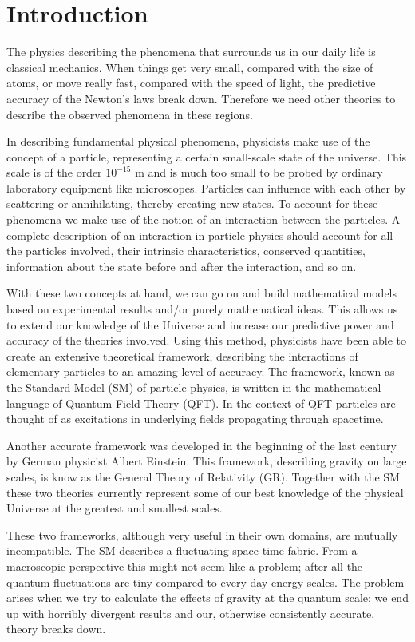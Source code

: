 \section{Introduction}
The physics describing the phenomena that surrounds us in our daily life is classical mechanics. When things get very small, compared with the size of atoms, or move really fast, compared with the speed of light, the predictive accuracy of the Newton's laws break down. Therefore we need other theories to describe the observed phenomena in these regions.

In describing fundamental physical phenomena, physicists make use of the concept of a particle, representing a certain small-scale state of the universe. This scale is of the order $10^{-15}$ m and is much too small to be probed by ordinary laboratory equipment like microscopes. Particles can influence with each other by scattering or annihilating, thereby creating new states. To account for these phenomena we make use of the notion of an interaction between the particles. A complete description of an interaction in particle physics should account for all the particles involved, their intrinsic characteristics, conserved quantities, information about the state before and after the interaction, and so on.

With these two concepts at hand, we can go on and build mathematical models based on experimental results and/or purely mathematical ideas. This allows us to extend our knowledge of the Universe and increase our predictive power and accuracy of the theories involved. Using this method, physicists have been able to create an extensive theoretical framework, describing the interactions of elementary particles to an amazing level of accuracy. The framework, known as the Standard Model (SM) of particle physics, is written in the mathematical language of Quantum Field Theory (QFT). In the context of QFT particles are thought of as excitations in underlying fields propagating through spacetime.

Another accurate framework was developed in the beginning of the last century by German physicist Albert Einstein. This framework, describing gravity on large scales, is know as the General Theory of Relativity (GR). Together with the SM these two theories currently represent some of our best knowledge of the physical Universe at the greatest and smallest scales.

These two frameworks, although very useful in their own domains, are mutually incompatible. The SM describes a fluctuating space time fabric. From a macroscopic perspective this might not seem like a problem; after all the quantum fluctuations are tiny compared to every-day energy scales. The problem arises when we try to calculate the effects of gravity at the quantum scale; we end up with horribly divergent results and our, otherwise consistently accurate, theory breaks down.

